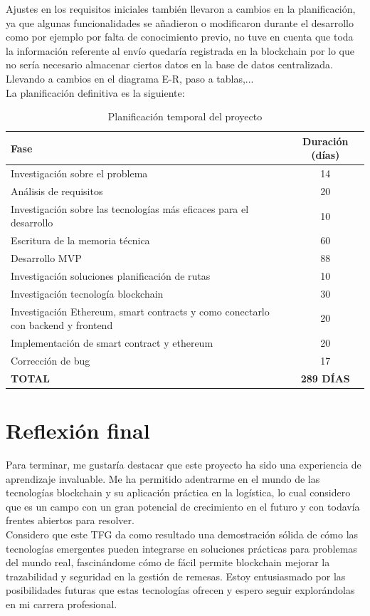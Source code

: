 Ajustes en los requisitos iniciales también llevaron a cambios en la planificación, ya que algunas funcionalidades se añadieron o modificaron
durante el desarrollo como por ejemplo por falta de conocimiento previo, no tuve en cuenta que toda la información referente al envío quedaría registrada en la blockchain por lo que
no sería necesario almacenar ciertos datos en la base de datos centralizada. Llevando a cambios en el diagrama E-R, paso a tablas,...\\

La planificación definitiva es la siguiente:
\begin{table}[H]
\centering
\renewcommand{\arraystretch}{1.3}
\setlength{\tabcolsep}{8pt}
\begin{tabular}{|p{8cm}|c|}
\hline
\textbf{Fase} & \textbf{Duración (días)} \\ \hline
Investigación sobre el problema & 14 \\ \hline
Análisis de requisitos & 20 \\ \hline
Investigación sobre las tecnologías más eficaces para el desarrollo & 10 \\ \hline
Escritura de la memoria técnica & 60 \\ \hline
Desarrollo MVP & 88 \\ \hline
Investigación soluciones planificación de rutas & 10 \\ \hline
Investigación tecnología blockchain & 30 \\ \hline
Investigación Ethereum, smart contracts y como conectarlo con backend y frontend & 20 \\ \hline
Implementación de smart contract y ethereum & 20 \\ \hline
Corrección de bug & 17 \\ \hline
\textbf{TOTAL} & \textbf{289 DÍAS} \\ \hline
\end{tabular}
\caption{Planificación temporal del proyecto}
\label{tab:planificacion}
\end{table}

\section{Reflexión final}
Para terminar, me gustaría destacar que este proyecto ha sido una experiencia de aprendizaje invaluable. Me ha permitido
adentrarme en el mundo de las tecnologías blockchain y su aplicación práctica en la logística, 
lo cual considero que es un campo con un gran potencial de crecimiento en el futuro y con todavía frentes abiertos para resolver.\\

Considero que este TFG da como resultado una demostración sólida de cómo las tecnologías emergentes pueden integrarse en
soluciones prácticas para problemas del mundo real, fascinándome cómo de fácil permite blockchain mejorar la trazabilidad y seguridad en
la gestión de remesas. Estoy entusiasmado por las posibilidades futuras que estas tecnologías ofrecen y espero seguir explorándolas en mi carrera profesional. 

